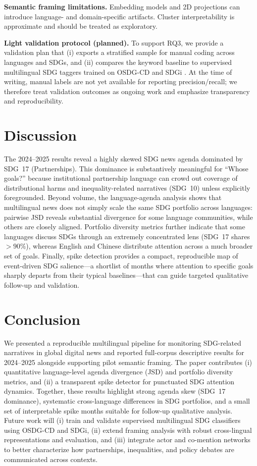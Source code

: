 \documentclass[11pt]{article}
\begin{document}
\textbf{Semantic framing limitations.} Embedding models and 2D projections can introduce language- and domain-specific artifacts. Cluster interpretability is approximate and should be treated as exploratory.

\textbf{Light validation protocol (planned).} To support RQ3, we provide a validation plan that (i) exports a stratified sample for manual coding across languages and SDGs, and (ii) compares the keyword baseline to supervised multilingual SDG taggers trained on OSDG-CD and SDGi \parencite{osdgcd2022,skrynnyk2024sdgi,undp2024sdgi}. At the time of writing, manual labels are not yet available for reporting precision/recall; we therefore treat validation outcomes as ongoing work and emphasize transparency and reproducibility.

\section{Discussion}
The 2024--2025 results reveal a highly skewed SDG news agenda dominated by SDG~17 (Partnerships). This dominance is substantively meaningful for ``Whose goals?'' because institutional partnership language can crowd out coverage of distributional harms and inequality-related narratives (SDG~10) unless explicitly foregrounded. Beyond volume, the language-agenda analysis shows that multilingual news does not simply scale the same SDG portfolio across languages: pairwise JSD reveals substantial divergence for some language communities, while others are closely aligned. Portfolio diversity metrics further indicate that some languages discuss SDGs through an extremely concentrated lens (SDG~17 shares $>90\%$), whereas English and Chinese distribute attention across a much broader set of goals. Finally, spike detection provides a compact, reproducible map of event-driven SDG salience---a shortlist of months where attention to specific goals sharply departs from their typical baselines---that can guide targeted qualitative follow-up and validation.

\section{Conclusion}
We presented a reproducible multilingual pipeline for monitoring SDG-related narratives in global digital news and reported full-corpus descriptive results for 2024--2025 alongside supporting pilot semantic framing. The paper contributes (i) quantitative language-level agenda divergence (JSD) and portfolio diversity metrics, and (ii) a transparent spike detector for punctuated SDG attention dynamics. Together, these results highlight strong agenda skew (SDG~17 dominance), systematic cross-language differences in SDG portfolios, and a small set of interpretable spike months suitable for follow-up qualitative analysis. Future work will (i) train and validate supervised multilingual SDG classifiers using OSDG-CD and SDGi, (ii) extend framing analysis with robust cross-lingual representations and evaluation, and (iii) integrate actor and co-mention networks to better characterize how partnerships, inequalities, and policy debates are communicated across contexts.
\end{document}
